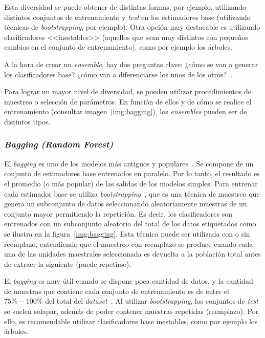 Esta diversidad se puede obtener de distintas formas, por ejemplo, utilizando distintos conjuntos de entrenamiento y \textit{test} en los estimadores base (utilizando técnicas de \textit{bootstrapping}, por ejemplo). Otra opción muy destacable es utilizando clasificadores <<inestables>> (aquellos que sean muy distintos con pequeños cambios en el conjunto de entrenamiento), como por ejemplo los árboles.

A la hora de crear un \textit{ensemble}, hay dos preguntas clave: ¿cómo se van a generar los clasificadores base? ¿cómo van a diferenciarse los unos de los otros?~\cite{ensembles2006robi}.

Para lograr un mayor nivel de diversidad, se pueden utilizar procedimientos de muestreo o selección de parámetros. En función de ellos y de cómo se realice el entrenamiento (consultar imagen~\ref{img:bagging}), los \textit{ensembles} pueden ser de distintos tipos.
	
\subsubsection{\textit{Bagging (Random Forest)}}

El \textit{bagging} es uno de los modelos más antiguos y populares~\cite{ensembles2006robi}. Se compone de un conjunto de estimadores base entrenados en paralelo. Por lo tanto, el resultado es el promedio (o más popular) de las salidas de los modelos simples. Para entrenar cada estimador base se utiliza \textit{bootstrapping}~\cite{engelen2018thesis}, que es una técnica de muestreo que genera un subconjunto de datos seleccionando aleatoriamente muestras de un conjunto mayor permitiendo la repetición. Es decir, los clasificadores son entrenados con un subconjunto aleatorio del total de los datos etiquetados como se ilustra en la figura~\ref{img:bagging}. Esta técnica puede ser utilizada con o sin reemplazo, entendiendo que el muestreo con reemplazo se produce cuando cada una de las unidades maestrales seleccionada es devuelta a la población total antes de extraer la siguiente (puede repetirse).

El \textit{bagging} es muy útil cuando se dispone poca cantidad de datos, y la cantidad de muestras que contiene cada conjunto de entrenamiento es de entre el $75\% - 100\%$ del total del \textit{dataset}~\cite{ensembles2006robi}. Al utilizar \textit{bootstrapping}, los conjuntos de \textit{test} se suelen solapar, además de poder contener muestras repetidas (reemplazo). Por ello, es recomendable utilizar clasificadores base inestables, como por ejemplo los árboles.

